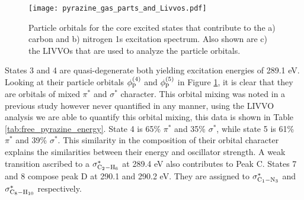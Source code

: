 \documentclass{article}
\begin{document}
\begin{figure}[t!]
\centering
\texttt{[image: pyrazine\_gas\_parts\_and\_Livvos.pdf]}
\caption{Particle orbitals for the core excited states that contribute to the a) carbon and b) nitrogen 1s excitation spectrum. Also shown are c) the LIVVOs that are used to analyze the particle orbitals.}
\label{free_pyrazine_parts_livvos}
\end{figure}

States 3 and 4 are quasi-degenerate both yielding excitation energies of 289.1 eV. Looking at their particle orbitals $\phi^{(4)}_{\rm p}$ and $\phi^{(5)}_{\rm p}$ in Figure \ref{free_pyrazine_parts_livvos}, it is clear that they are orbitals of mixed $\pi^*$ and $\sigma^*$ character. This orbital mixing was noted in a previous study\cite{vall-llosera_c_2008} however never quantified in any manner, using the LIVVO analysis we are able to quantify this orbital mixing, this data is shown in Table \ref{tab:free_pyrazine_energy}. State 4 is 65\% $\pi^*$ and 35\% $\sigma^*$, while state 5 is 61\% $\pi^*$ and 39\% $\sigma^*$. This similarity in the composition of their orbital character explains the similarities between their energy and oscillator strength. A weak transition ascribed to a $\sigma^*_{\rm C_2-H_6}$ at 289.4 eV also contributes to Peak C. States 7 and 8 compose peak D at 290.1 and 290.2 eV. They are assigned to $\sigma^*_{\rm C_1-N_3}$ and $\sigma^*_{\rm C_8-H_{10}}$ respectively.
\end{document}
